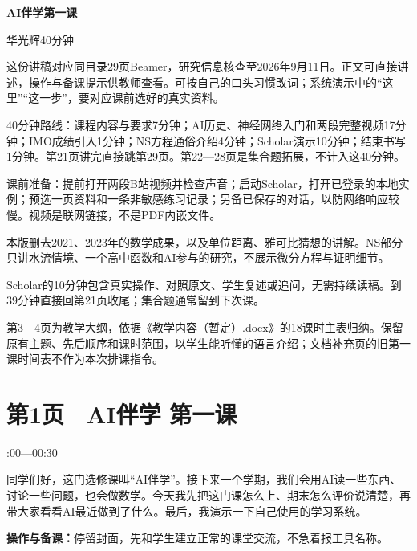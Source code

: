 \documentclass[UTF8,a4paper,11pt,fontset=fandol]{ctexart}
\newcommand{\tip}[1]{\par{\small\color{black!65}\noindent\textbf{操作与备课：}#1\par}}
\begin{document}
\begin{center}{\LARGE\bfseries\color{schoolgreen}AI伴学第一课}\par\vspace{4mm}{\large 教师讲稿}\par\vspace{3mm}华光辉\quad 40分钟\end{center}






这份讲稿对应同目录29页Beamer，研究信息核查至2026年9月11日。正文可直接讲述，操作与备课提示供教师查看。可按自己的口头习惯改词；系统演示中的“这里”“这一步”，要对应课前选好的真实资料。

40分钟路线：课程内容与要求7分钟；AI历史、神经网络入门和两段完整视频17分钟；IMO成绩引入1分钟；NS方程通俗介绍4分钟；Scholar演示10分钟；结束书写1分钟。第21页讲完直接跳第29页。第22—28页是集合题拓展，不计入这40分钟。

课前准备：提前打开两段B站视频并检查声音；启动Scholar，打开已登录的本地实例；预选一页资料和一条非敏感练习记录；另备已保存的对话，以防网络响应较慢。视频是联网链接，不是PDF内嵌文件。

本版删去2021、2023年的数学成果，以及单位距离、雅可比猜想的讲解。NS部分只讲水流情境、一个高中函数和AI参与的研究，不展示微分方程与证明细节。

Scholar的10分钟包含真实操作、对照原文、学生复述或追问，无需持续读稿。到39分钟直接回第21页收尾；集合题通常留到下次课。

第3—4页为教学大纲，依据《教学内容（暂定）.docx》的18课时主表归纳。保留原有主题、先后顺序和课时范围，以学生能听懂的语言介绍；文档补充页的旧第一课时间表不作为本次排课指令。


\clearpage

\par\noindent\begin{minipage}{\linewidth}

\section*{第1页　AI伴学 第一课}

{\small{}:00—00:30\par}

同学们好，这门选修课叫“AI伴学”。接下来一个学期，我们会用AI读一些东西、讨论一些问题，也会做数学。今天我先把这门课怎么上、期末怎么评价说清楚，再带大家看看AI最近做到了什么。最后，我演示一下自己使用的学习系统。

\tip{停留封面，先和学生建立正常的课堂交流，不急着报工具名称。}

\end{minipage}\par\vspace{2mm}
\end{document}
